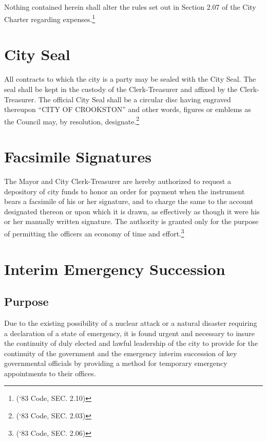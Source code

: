 \subsection{}
Nothing contained herein shall alter the rules set out in Section 2.07 of the City Charter regarding expenses.\footnote{(‘83 Code, SEC. 2.10)}

\section{City Seal}
All contracts to which the city is a party may be sealed with the City Seal.  The seal shall be kept in the custody of the Clerk-Treasurer and affixed by the Clerk-Treasurer.  The official City Seal shall be a circular disc having engraved thereupon “CITY OF CROOKSTON” and other words, figures or emblems as the Council may, by resolution, designate.\footnote{(‘83 Code, SEC. 2.03)}

\section{Facsimile Signatures}
The Mayor and City Clerk-Treasurer are hereby authorized to request a depository of city funds to honor an order for payment when the instrument bears a facsimile of his or her signature, and to charge the same to the account designated thereon or upon which it is drawn, as effectively as though it were his or her manually written signature. The authority is granted only for the purpose of permitting the officers an economy of time and effort.\footnote{(‘83 Code, SEC. 2.06)}

\section{Interim Emergency Succession}
\subsection{Purpose}
Due to the existing possibility of a nuclear attack or a natural disaster requiring a declaration of a state of emergency, it is found urgent and necessary to insure the continuity of duly elected and lawful leadership of the city to provide for the continuity of the government and the emergency interim succession of key governmental officials by providing a method for temporary emergency appointments to their offices.
